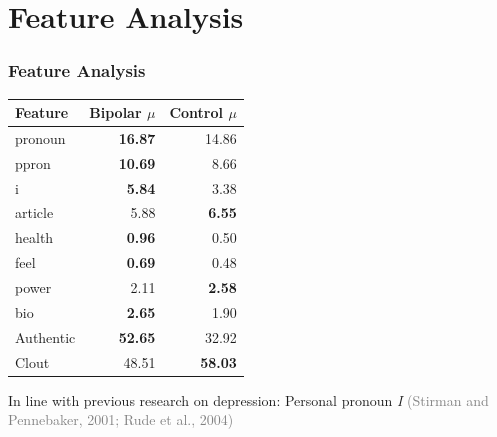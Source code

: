\documentclass{beamer}
\newcommand{\maybe}[1]{\textcolor{gray}{#1}}
\begin{document}
\section{Feature Analysis}
\begin{frame}
  \frametitle{Feature Analysis}

\begin{table}[]
\centering
{\small
\begin{tabular}{lrr}
\toprule
Feature    & Bipolar $\mu$    & Control $\mu$    \\ 
\midrule
  pronoun    & \textbf{16.87} & 14.86 \\
  ppron             & \textbf{10.69} & 8.66  \\
  i                & \textbf{5.84}  & 3.38  \\
  article     & 5.88  & \textbf{6.55} \\
  health           & \textbf{0.96}  & 0.50  \\
  feel       & \textbf{0.69}  & 0.48  \\
  power     & 2.11  & \textbf{2.58}  \\
  bio         & \textbf{2.65}  & 1.90  \\
  Authentic        & \textbf{52.65} & 32.92 \\
  Clout       & 48.51 & \textbf{58.03} \\
\bottomrule
\end{tabular}}
\end{table}
In line with previous research on depression: Personal pronoun \textit{I} \maybe{(Stirman and Pennebaker, 2001; Rude et al., 2004)}%
\end{frame}
\end{document}
